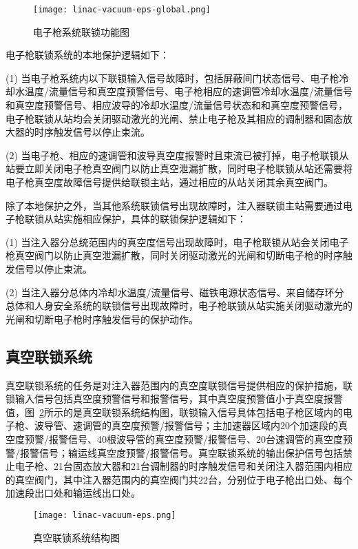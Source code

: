 \begin{figure}[!htb]
	\centering
	\texttt{[image: linac-vacuum-eps-global.png]}
	\caption{电子枪系统联锁功能图}
	\label{fig:linac-vacuum-eps-global}
\end{figure}

电子枪联锁系统的本地保护逻辑如下：

(1) 当电子枪系统内以下联锁输入信号故障时，包括屏蔽间门状态信号、电子枪冷却水温度/流量信号和真空度预警信号、电子枪相应的速调管冷却水温度/流量信号和真空度预警信号、相应波导的冷却水温度/流量信号状态和和真空度预警信号，电子枪联锁从站均会关闭驱动激光的光闸、禁止电子枪及其相应的调制器和固态放大器的时序触发信号以停止束流。

(2) 当电子枪、相应的速调管和波导真空度报警时且束流已被打掉，电子枪联锁从站要立即关闭电子枪真空阀门以防止真空泄漏扩散，同时电子枪联锁从站还需要将电子枪真空度故障信号提供给联锁主站，通过相应的从站关闭其余真空阀门。
  		

除了本地保护之外，当其他系统联锁信号出现故障时，注入器联锁主站需要通过电子枪联锁从站实施相应保护，具体的联锁保护逻辑如下：

(1) 当注入器分总统范围内的真空度信号出现故障时，电子枪联锁从站会关闭电子枪真空阀门以防止真空泄漏扩散，同时关闭驱动激光的光闸和切断电子枪的时序触发信号以停止束流。

(2) 当注入器分总体内冷却水温度/流量信号、磁铁电源状态信号、来自储存环分总体和人身安全系统的联锁信号出现故障时，电子枪联锁从站实施关闭驱动激光的光闸和切断电子枪时序触发信号的保护动作。
  		


\subsection{真空联锁系统}

真空联锁系统的任务是对注入器范围内的真空度联锁信号提供相应的保护措施，联锁输入信号包括真空度预警信号和报警信号，其中真空度预警值小于真空度报警值，图~\ref{fig:linac-vacuum-eps}所示的是真空联锁系统结构图，联锁输入信号具体包括电子枪区域内的电子枪、波导管、速调管的真空度预警/报警信号；主加速器区域内20个加速段的真空度预警/报警信号、40根波导管的真空度预警/报警信号、20台速调管的真空度预警/报警信号；输运线真空度预警/报警信号。真空联锁系统的输出保护信号包括禁止电子枪、21台固态放大器和21台调制器的时序触发信号和关闭注入器范围内相应的真空阀门，其中注入器范围内的真空阀门共22台，分别位于电子枪出口处、每个加速段出口处和输运线出口处\cite{wei2014}。

\begin{figure}[!htb]
	\centering
	\texttt{[image: linac-vacuum-eps.png]}
	\caption{真空联锁系统结构图}
	\label{fig:linac-vacuum-eps}
\end{figure}

